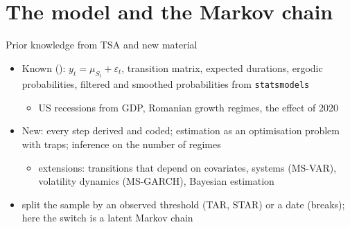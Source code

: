 \section{The model and the Markov chain}

\begin{frame}{Prior knowledge from TSA and new material}
\itemsize{\small}
\begin{itemize}
    \item Known (): $y_t = \mu_{S_t} + \varepsilon_t$, transition matrix, expected durations, ergodic probabilities, filtered and smoothed probabilities from \texttt{statsmodels}
    \begin{itemize}
        \item US recessions from GDP, Romanian growth regimes, the effect of 2020
    \end{itemize}
    \item New: every step derived and coded; estimation as an optimisation problem with traps; inference on the number of regimes
    \begin{itemize}
        \item extensions: transitions that depend on covariates, systems (MS-VAR), volatility dynamics (MS-GARCH), Bayesian estimation
    \end{itemize}
    \item {} split the sample by an observed threshold (TAR, STAR) or a date (breaks); here the switch is a latent Markov chain
\end{itemize}
\end{frame}

